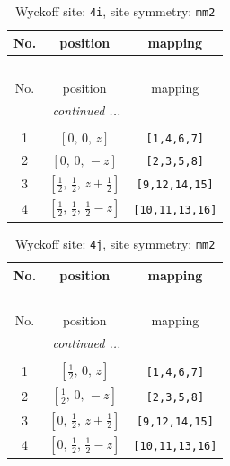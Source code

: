 \documentclass[fleqn,8pt]{jsarticle}
\begin{document}
\renewcommand{\arraystretch}{1.2}
\begin{longtable}{ccc}
\caption{Wyckoff site: {\tt 4i}, site symmetry: {\tt mm2}}
 \\
 \hline \hline
No. & position & mapping \\ \hline \endfirsthead

\multicolumn{2}{l}{\tablename\ \thetable{}} \\
 \hline \hline
No. & position & mapping \\ \hline \endhead

 \hline \hline
\multicolumn{2}{r}{\footnotesize\it continued ...} \\ \endfoot

 \hline \hline
\multicolumn{2}{r}{} \\ \endlastfoot

1 & $\left[ 0,\, 0,\, z \right]$ & {\tt [1,4,6,7]} \\ \hline
2 & $\left[ 0,\, 0,\, - z \right]$ & {\tt [2,3,5,8]} \\ \hline
3 & $\left[ \frac{1}{2},\, \frac{1}{2},\, z + \frac{1}{2} \right]$ & {\tt [9,12,14,15]} \\ \hline
4 & $\left[ \frac{1}{2},\, \frac{1}{2},\, \frac{1}{2} - z \right]$ & {\tt [10,11,13,16]} \\
\end{longtable}
\renewcommand{\arraystretch}{1.2}
\begin{longtable}{ccc}
\caption{Wyckoff site: {\tt 4j}, site symmetry: {\tt mm2}}
 \\
 \hline \hline
No. & position & mapping \\ \hline \endfirsthead

\multicolumn{2}{l}{\tablename\ \thetable{}} \\
 \hline \hline
No. & position & mapping \\ \hline \endhead

 \hline \hline
\multicolumn{2}{r}{\footnotesize\it continued ...} \\ \endfoot

 \hline \hline
\multicolumn{2}{r}{} \\ \endlastfoot

1 & $\left[ \frac{1}{2},\, 0,\, z \right]$ & {\tt [1,4,6,7]} \\ \hline
2 & $\left[ \frac{1}{2},\, 0,\, - z \right]$ & {\tt [2,3,5,8]} \\ \hline
3 & $\left[ 0,\, \frac{1}{2},\, z + \frac{1}{2} \right]$ & {\tt [9,12,14,15]} \\ \hline
4 & $\left[ 0,\, \frac{1}{2},\, \frac{1}{2} - z \right]$ & {\tt [10,11,13,16]} \\
\end{longtable}
\end{document}
